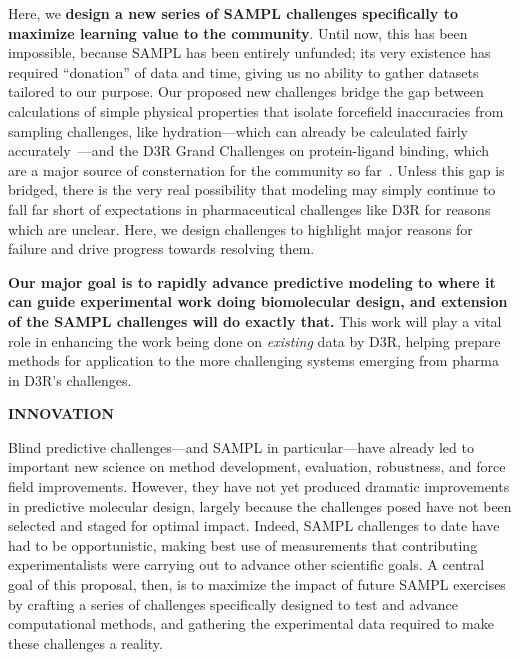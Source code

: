 \documentclass[11pt]{article}
\begin{document}
Here, we \textbf{design a new series of SAMPL challenges specifically to maximize learning value to the community}.
Until now, this has been impossible, because SAMPL has been entirely unfunded; its very existence has required ``donation'' of data and time, giving us no ability to gather datasets tailored to our purpose. 
Our proposed new challenges bridge the gap between calculations of simple physical properties that isolate forcefield inaccuracies from sampling challenges, like hydration---which can already be calculated fairly accurately~\cite{mobley_blind_2014-1}---and the D3R Grand Challenges on protein-ligand binding, which are a major source of consternation for the community so far~\cite{ignjatovic_binding-affinity_2016, deng_large_2016, sunseri_d3r_2016, gathiaka_d3r_2016}.
Unless this gap is bridged, there is the very real possibility that modeling may simply continue to fall far short of expectations in pharmaceutical challenges like D3R for reasons which are unclear.
Here, we design challenges to highlight major reasons for failure and drive progress towards resolving them.


\textbf{Our major goal is to rapidly advance predictive modeling to where it can guide experimental work doing biomolecular design, and extension of the SAMPL challenges will do exactly that.} This work will play a vital role in enhancing the work being done on \emph{existing} data by D3R, helping prepare methods for application to the more challenging systems emerging from pharma in D3R's challenges. 

{\large \bf INNOVATION}

Blind predictive challenges---and SAMPL in particular---have already led to important new science on method development, evaluation, robustness, and force field improvements. 
However, they have not yet produced dramatic improvements in predictive molecular design, largely because the challenges posed have not been selected and staged for optimal impact. 
Indeed, SAMPL challenges to date have had to be opportunistic, making best use of measurements that contributing experimentalists were carrying out to advance other scientific goals. 
A central goal of this proposal, then, is to maximize the impact of future SAMPL exercises by crafting a series of challenges specifically designed to test and advance computational methods, and gathering the experimental data required to make these challenges a reality. 
\end{document}
